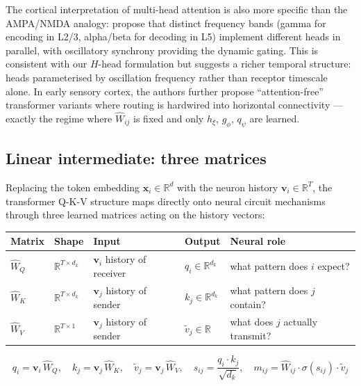 \documentclass[11pt]{article}
\begin{document}
The cortical interpretation of multi-head attention is also more specific
than the AMPA/NMDA analogy: \citet{konig2026} propose that distinct
frequency bands (gamma for encoding in L2/3, alpha/beta for decoding in L5)
implement different heads in parallel, with oscillatory synchrony providing
the dynamic gating. This is consistent with our $H$-head formulation but
suggests a richer temporal structure: heads parameterised by oscillation
frequency rather than receptor timescale alone. In early sensory cortex,
the authors further propose ``attention-free'' transformer variants where
routing is hardwired into horizontal connectivity --- exactly the regime
where $\hat{W}_{ij}$ is fixed and only $h_\xi$, $g_\phi$, $q_\psi$ are
learned.

\subsection*{Linear intermediate: three matrices}

Replacing the token embedding $\mathbf{x}_i \in \mathbb{R}^d$ with the
neuron history $\mathbf{v}_i \in \mathbb{R}^T$, the transformer Q-K-V
structure maps directly onto neural circuit mechanisms through three
learned matrices acting on the history vectors:

\begin{center}
\begin{tabular}{lllll}
\toprule
Matrix & Shape & Input & Output & Neural role \\
\midrule
$\hat{W}_Q$ & $\mathbb{R}^{T \times d_k}$ & $\mathbf{v}_i$ history of receiver
  & $q_i \in \mathbb{R}^{d_k}$ & what pattern does $i$ expect? \\
$\hat{W}_K$ & $\mathbb{R}^{T \times d_k}$ & $\mathbf{v}_j$ history of sender
  & $k_j \in \mathbb{R}^{d_k}$ & what pattern does $j$ contain? \\
$\hat{W}_V$ & $\mathbb{R}^{T \times 1}$   & $\mathbf{v}_j$ history of sender
  & $\tilde{v}_j \in \mathbb{R}$  & what does $j$ actually transmit? \\
\bottomrule
\end{tabular}
\end{center}

\begin{equation}
q_i = \mathbf{v}_i\,\hat{W}_Q, \quad
k_j = \mathbf{v}_j\,\hat{W}_K, \quad
\tilde{v}_j = \mathbf{v}_j\,\hat{W}_V, \quad
s_{ij} = \frac{q_i \cdot k_j}{\sqrt{d_k}}, \quad
m_{ij} = \hat{W}_{ij} \cdot \sigma(s_{ij}) \cdot \tilde{v}_j
\end{equation}
\end{document}
